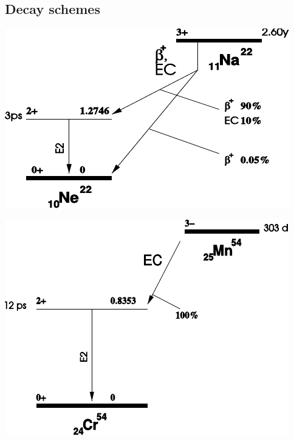 \subsection{Decay schemes}
%
\begin{center}
    \begin{adjustbox}{max width=\linewidth, keepaspectratio}
        \includegraphics[]{pdf/22Na}
    \end{adjustbox}
    \label{fig:22NaDecayScheme}
\end{center}
%
\begin{center}
    \begin{adjustbox}{max width=\linewidth, keepaspectratio}
        \includegraphics[]{pdf/54Mn}
    \end{adjustbox}
    \label{fig:54MnDecayScheme}
\end{center}
